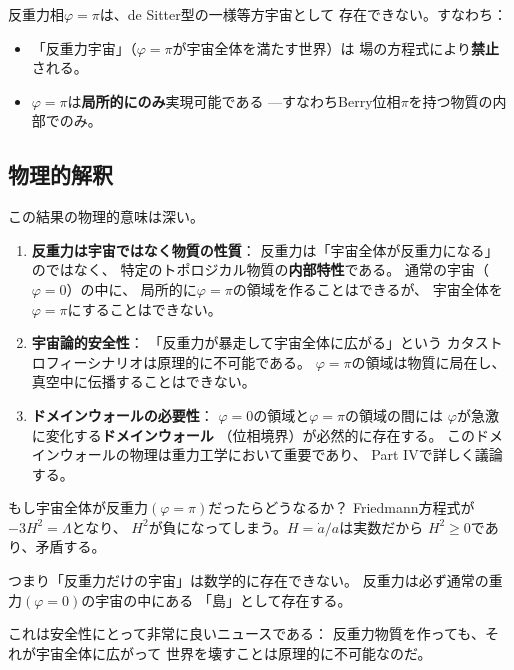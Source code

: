 \begin{keyresult}[$\varphi=\pi$相の宇宙論的不在]
反重力相$\varphi = \pi$は、de Sitter型の一様等方宇宙として
存在できない。すなわち：
\begin{itemize}
\item 「反重力宇宙」（$\varphi=\pi$が宇宙全体を満たす世界）は
  場の方程式により\textbf{禁止}される。
\item $\varphi = \pi$は\textbf{局所的にのみ}実現可能である
  ---すなわちBerry位相$\pi$を持つ物質の内部でのみ。
\end{itemize}
\end{keyresult}

\subsection{物理的解釈}

この結果の物理的意味は深い。

\begin{enumerate}[label=(\arabic*)]
\item \textbf{反重力は宇宙ではなく物質の性質}：
反重力は「宇宙全体が反重力になる」のではなく、
特定のトポロジカル物質の\textbf{内部特性}である。
通常の宇宙（$\varphi=0$）の中に、
局所的に$\varphi=\pi$の領域を作ることはできるが、
宇宙全体を$\varphi=\pi$にすることはできない。

\item \textbf{宇宙論的安全性}：
「反重力が暴走して宇宙全体に広がる」という
カタストロフィーシナリオは原理的に不可能である。
$\varphi=\pi$の領域は物質に局在し、
真空中に伝播することはできない。

\item \textbf{ドメインウォールの必要性}：
$\varphi=0$の領域と$\varphi=\pi$の領域の間には
$\varphi$が急激に変化する\textbf{ドメインウォール}
（位相境界）が必然的に存在する。
このドメインウォールの物理は重力工学において重要であり、
Part IVで詳しく議論する。
\end{enumerate}

\begin{hsbox}
もし宇宙全体が反重力$(\varphi=\pi)$だったらどうなるか？
Friedmann方程式が$-3H^2 = \Lambda$となり、
$H^2$が負になってしまう。$H = \dot a / a$は実数だから
$H^2 \geq 0$であり、矛盾する。

つまり「反重力だけの宇宙」は数学的に存在できない。
反重力は必ず通常の重力$(\varphi=0)$の宇宙の中にある
「島」として存在する。

これは安全性にとって非常に良いニュースである：
反重力物質を作っても、それが宇宙全体に広がって
世界を壊すことは原理的に不可能なのだ。
\end{hsbox}


